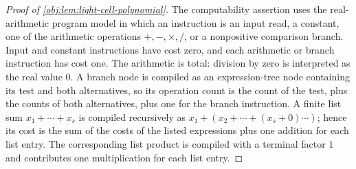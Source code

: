 \documentclass[11pt]{article}
\begin{document}
\begin{proof}[Proof of \cref{obj:lem:light-cell-polynomial}]
The computability assertion uses the real-arithmetic program model in which an instruction is an input read, a constant, one of the arithmetic operations \(+, -, \times, /\), or a nonpositive comparison branch.  Input and constant instructions have cost zero, and each arithmetic or branch instruction has cost one.  The arithmetic is total: division by zero is interpreted as the real value \(0\).  A branch node is compiled as an expression-tree node containing its test and both alternatives, so its operation count is the count of the test, plus the counts of both alternatives, plus one for the branch instruction.  A finite list sum \(x_1+\cdots+x_s\) is compiled recursively as \(x_1+(x_2+\cdots+(x_s+0)\cdots)\); hence its cost is the sum of the costs of the listed expressions plus one addition for each list entry.  The corresponding list product is compiled with a terminal factor \(1\) and contributes one multiplication for each list entry.


\end{proof}
\end{document}
